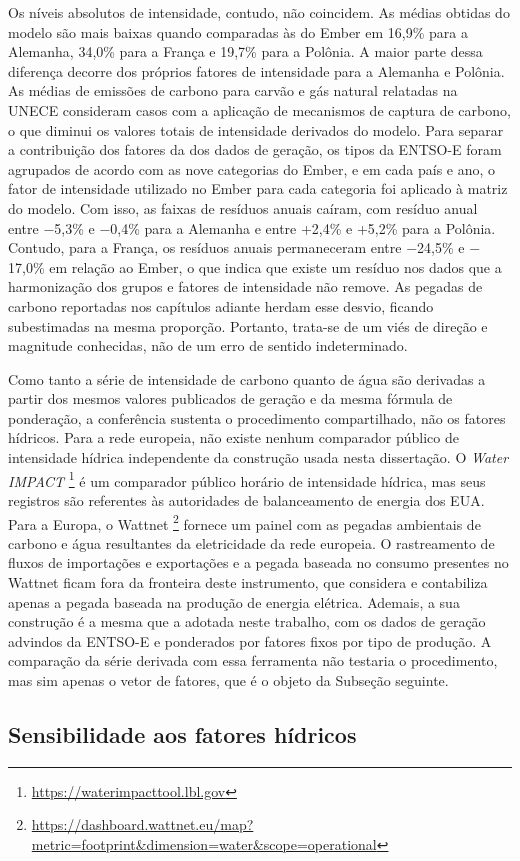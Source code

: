 Os níveis absolutos de intensidade, contudo, não coincidem. As médias obtidas do modelo são mais baixas quando comparadas às do Ember
em 16,9\% para a Alemanha, 34,0\% para a França e 19,7\% para a Polônia. A maior parte dessa diferença decorre dos
próprios fatores de intensidade para a Alemanha e Polônia. As médias de emissões de carbono para carvão e gás natural
relatadas na UNECE consideram casos com a aplicação de mecanismos de captura de carbono, o que diminui os valores totais de intensidade
derivados do modelo. Para separar a contribuição dos fatores da dos dados de geração, os tipos da ENTSO-E foram agrupados de acordo com as nove categorias do Ember,
e em cada país e ano, o fator de intensidade utilizado no Ember para cada categoria foi aplicado à matriz do modelo. Com isso,
as faixas de resíduos anuais caíram, com resíduo anual entre $-$5,3\% e $-$0,4\% para a Alemanha e entre +2,4\% e +5,2\% 
para a Polônia. Contudo, para a França, os resíduos anuais permaneceram entre $-$24,5\% e $-$17,0\% em relação ao Ember, 
o que indica que existe um resíduo nos dados que a harmonização dos grupos e fatores de intensidade não remove.
As pegadas de carbono reportadas nos capítulos adiante herdam esse desvio, ficando subestimadas na mesma proporção. Portanto, 
trata-se de um viés de direção e magnitude conhecidas, não de um erro de sentido indeterminado.

Como tanto a série de intensidade de carbono quanto de água são derivadas a partir dos mesmos valores publicados de geração e da mesma fórmula de ponderação,
a conferência sustenta o procedimento compartilhado, não os fatores hídricos. Para a rede europeia, não existe nenhum comparador 
público de intensidade hídrica independente da construção usada 
nesta dissertação. O \textit{Water IMPACT} \citep{water-siddik-2024}\footnote{\url{https://waterimpacttool.lbl.gov}}  
é um comparador público horário de intensidade hídrica, mas seus registros são referentes
às autoridades de balanceamento de energia dos EUA. Para a Europa, o Wattnet \citep{wattnet-2026}\footnote{\url{https://dashboard.wattnet.eu/map?metric=footprint&dimension=water&scope=operational}} 
fornece um painel com as
pegadas ambientais de carbono e água resultantes da eletricidade da rede europeia. O rastreamento de fluxos de importações e exportações e a pegada baseada
no consumo presentes no Wattnet ficam fora da fronteira deste instrumento, que considera e contabiliza apenas a pegada baseada 
na produção de energia elétrica. Ademais, a sua construção
é a mesma que a adotada neste trabalho, com os dados de geração advindos da ENTSO-E e ponderados por fatores fixos por tipo de produção. 
A comparação da série derivada com essa ferramenta não testaria o procedimento, mas sim apenas o vetor de fatores, que é o objeto da Subseção seguinte.

\subsection{Sensibilidade aos fatores hídricos}
\label{subsec:sensibilidade-hidrica}
